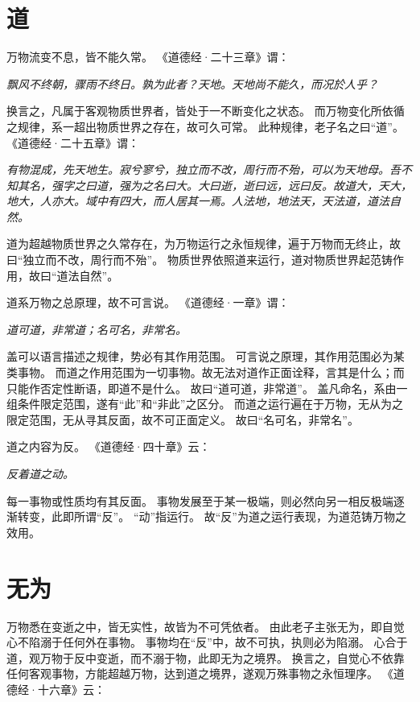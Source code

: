 \documentclass[11pt]{article}
\begin{document}
\newline

\section{道}
万物流变不息，皆不能久常。
《道德经·二十三章》谓：

\textit{飘风不终朝，骤雨不终日。孰为此者？天地。天地尚不能久，而况於人乎？}

换言之，凡属于客观物质世界者，皆处于一不断变化之状态。
而万物变化所依循之规律，系一超出物质世界之存在，故可久可常。
此种规律，老子名之曰“道”。
《道德经·二十五章》谓：

\textit{有物混成，先天地生。寂兮寥兮，独立而不改，周行而不殆，可以为天地母。吾不知其名，强字之曰道，强为之名曰大。大曰逝，逝曰远，远曰反。故道大，天大，地大，人亦大。域中有四大，而人居其一焉。人法地，地法天，天法道，道法自然。}

道为超越物质世界之久常存在，为万物运行之永恒规律，遍于万物而无终止，故曰“独立而不改，周行而不殆”。
物质世界依照道来运行，道对物质世界起范铸作用，故曰“道法自然”。

\newline

道系万物之总原理，故不可言说。
《道德经·一章》谓：

\textit{道可道，非常道；名可名，非常名。}

盖可以语言描述之规律，势必有其作用范围。
可言说之原理，其作用范围必为某类事物。
而道之作用范围为一切事物。故无法对道作正面诠释，言其是什么；而只能作否定性断语，即道不是什么。
故曰“道可道，非常道”。
盖凡命名，系由一组条件限定范围，遂有“此”和“非此”之区分。
而道之运行遍在于万物，无从为之限定范围，无从寻其反面，故不可正面定义。
故曰“名可名，非常名”。

\newline

道之内容为反。
《道德经·四十章》云：

\textit{反着道之动。}

每一事物或性质均有其反面。
事物发展至于某一极端，则必然向另一相反极端逐渐转变，此即所谓“反”。
“动”指运行。
故“反”为道之运行表现，为道范铸万物之效用。
  
\section{无为}
万物悉在变逝之中，皆无实性，故皆为不可凭依者。
由此老子主张无为，即自觉心不陷溺于任何外在事物。
事物均在“反”中，故不可执，执则必为陷溺。
心合于道，观万物于反中变逝，而不溺于物，此即无为之境界。
换言之，自觉心不依靠任何客观事物，方能超越万物，达到道之境界，遂观万殊事物之永恒理序。
《道德经·十六章》云：
\end{document}
